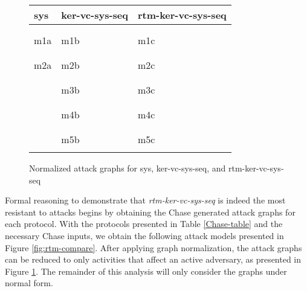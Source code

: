 \documentclass[runningheads]{llncs}
\theoremstyle{definition}
\begin{document}
\setlength{\textfloatsep}{0.1cm}
\begin{figure}[hbtp]
    \begin{center}
        \begin{tabular}{ M{3.6cm} | M{4.1cm} | M{4.1cm} }
                sys & ker-vc-sys-seq & rtm-ker-vc-sys-seq \\
                \hline
                &&\\  &  &  \\ 
                m1a & m1b & m1c \\ 
                &&\\
                 &  &   \\   
                m2a & m2b & m2c \\ 
                &&\\
                &   &  \\  
                  & m3b & m3c \\ 
                 &&\\ 
                  &  &   \\
                 & m4b & m4c \\ 
                &&\\  
                 &  &    \\
                 & m5b & m5c \\ 
                &&\\
            \end{tabular}
    \end{center}
    \caption{Normalized attack graphs for sys, ker-vc-sys-seq, and rtm-ker-vc-sys-seq}
    \label{fig:rtm-compare-reduced}
\end{figure}


Formal reasoning to demonstrate that \emph{rtm-ker-vc-sys-seq} is indeed the most resistant to attacks begins by obtaining the Chase generated attack graphs for each protocol. With the protocols presented in Table \ref{Chase-table} and the necessary Chase inputs, we obtain the following attack models presented in Figure \ref{fig:rtm-compare}. After applying graph normalization, the attack graphs can be reduced to only activities that affect an active adversary, as presented in Figure \ref{fig:rtm-compare-reduced}.  The remainder of this analysis will only consider the graphs under normal form. 
\end{document}
